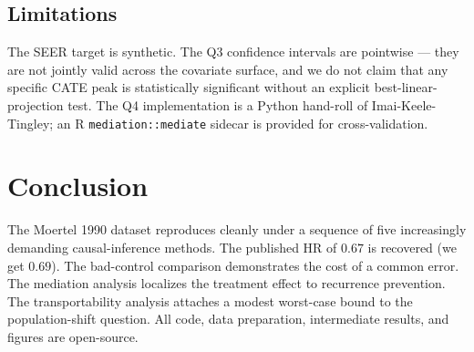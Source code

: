 \documentclass[conference]{IEEEtran}
\begin{document}
\subsection{Limitations}

The SEER target is synthetic. The Q3 confidence intervals are pointwise --- they are not jointly valid across the covariate surface, and we do not claim that any specific CATE peak is statistically significant without an explicit best-linear-projection test. The Q4 implementation is a Python hand-roll of Imai-Keele-Tingley; an R \texttt{mediation::mediate} sidecar is provided for cross-validation.

\section{Conclusion}

The Moertel 1990 dataset reproduces cleanly under a sequence of five increasingly demanding causal-inference methods. The published HR of $0.67$ is recovered (we get $0.69$). The bad-control comparison demonstrates the cost of a common error. The mediation analysis localizes the treatment effect to recurrence prevention. The transportability analysis attaches a modest worst-case bound to the population-shift question. All code, data preparation, intermediate results, and figures are open-source.
\end{document}
